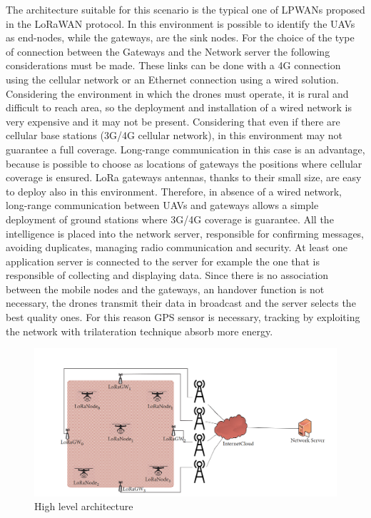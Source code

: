 \documentclass[12pt]{report}
\begin{document}
The architecture suitable for this scenario is the typical one of LPWANs proposed 
in the LoRaWAN protocol. In this environment is possible to identify the UAVs as end-nodes, 
while the gateways, are the sink nodes. For the choice of 
the type of connection between the Gateways and the Network server the following 
considerations must be made. These links can be done with a 4G connection using the cellular 
network or an Ethernet connection using a wired solution. Considering the environment in 
which the drones must operate, it is rural and difficult to reach area, so the deployment and 
installation of a wired network is very expensive and it may not be present. Considering that even
if there are cellular base stations (3G/4G cellular network), in this environment may not
guarantee a full coverage. 
Long-range communication in this case is an advantage, because is possible to choose as locations of gateways the positions
where cellular coverage is ensured. LoRa gateways antennas, thanks to their small size, are  
easy to deploy also in this environment. 
Therefore, in absence of a wired network, long-range communication between UAVs and 
gateways allows a simple deployment of ground stations where 3G/4G coverage is guarantee. All the intelligence is placed into the network server, responsible for confirming messages, avoiding duplicates, managing radio communication and security. At least one application server is connected to the server for example the one that is responsible of collecting and displaying data. 
Since there is no association between the mobile nodes and the gateways, an handover function is not necessary, the drones transmit their data in broadcast and the server selects the best quality ones. For this reason GPS sensor is necessary, tracking by exploiting the network with trilateration technique absorb more energy.

\begin{figure}[h!]
    \centering
    \includegraphics[width=14cm]{Pictures/High level arch.png}
    \caption{High level architecture}
\end{figure}
\end{document}
